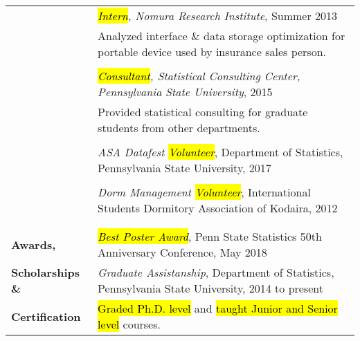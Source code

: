 \documentclass[utf8,letterpaper,oneside]{article}
\begin{document}
\begin{center}
\begin{tabular}{l l}
                           & \textit{\hl{Intern}, Nomura Research Institute}, Summer 2013                                                  \\
                           & Analyzed interface \& data storage optimization for portable device used by insurance sales person.           \\
                           &                                                                                                               \\
                           & \textit{\hl{Consultant}, Statistical Consulting Center, Pennsylvania State University}, 2015                  \\
                           & Provided statistical consulting for graduate students from other departments.                                 \\
                           &                                                                                                               \\
                           & \textit{ASA Datafest \hl{Volunteer}}, Department of Statistics, Pennsylvania State University, 2017           \\
                           &                                                                                                               \\
                           & \textit{Dorm Management \hl{Volunteer}}, International Students Dormitory Association of Kodaira, 2012        \\
                           &                                                                                                               
  \\\hline
                           &                                                                                                               \\
  \textbf{Awards, }        & \hl{\textit{Best Poster Award}}, Penn State Statistics 50th Anniversary Conference, May 2018                  \\
  \textbf{Scholarships \&}
                           &                                                                                                               
  \textit{Graduate Assistanship}, Department of Statistics, Pennsylvania State University, 2014 to present                                 \\
  \textbf{Certification}   & \hl{Graded Ph.D. level} and \hl{taught Junior and Senior level} courses.                                      \\
  

\end{tabular}
\end{center}
\end{document}
